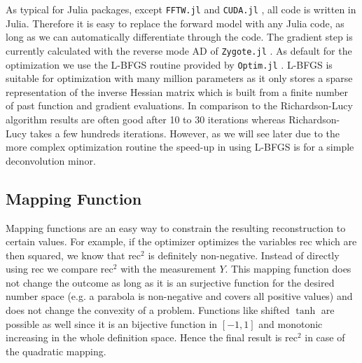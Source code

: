 \documentclass{juliacon}
\begin{document}
As typical for Julia packages, except \verb|FFTW.jl| and \verb|CUDA.jl| \cite{besard2018juliagpu}, all code is written in Julia.
Therefore it is easy to replace the forward model with any Julia code, as long as we can 
automatically differentiate through the code. The gradient step is currently calculated with the reverse mode AD of \verb|Zygote.jl| \cite{Zygote.jl-2018}. 
As default for the optimization we use the L-BFGS \cite{LBFGS} routine provided by \verb|Optim.jl| \cite{mogensen2018optim}.
L-BFGS is suitable for optimization with many million parameters as it only stores a sparse representation of the inverse Hessian matrix
which is built from a finite number of past function and gradient evaluations. 
In comparison to the Richardson-Lucy algorithm results are often good after 10 to 30 iterations whereas Richardson-Lucy takes
a few hundreds iterations. 
However, as we will see later due to the more complex optimization routine the speed-up in using L-BFGS is for a simple 
deconvolution minor.



\subsection{Mapping Function}
    Mapping functions are an easy way to constrain the resulting reconstruction to certain values.
    For example, if the optimizer optimizes the variables $\text{rec}$ which are then squared, we know that
    $\text{rec}^2$ is definitely non-negative. Instead of directly using $\text{rec}$ we compare
    $\text{rec}^2$ with the measurement $Y$. This mapping function does not change the outcome as long
    as it is an surjective function for the desired number space (e.g. a parabola is non-negative and covers all positive values) 
    and does not change the convexity of a problem.
    Functions like shifted $\tanh$ are possible as well since it is an bijective function in $[-1, 1]$ and monotonic increasing
    in the whole definition space.
    Hence the final result is $\text{rec}^2$ in case of the quadratic mapping.
\end{document}
